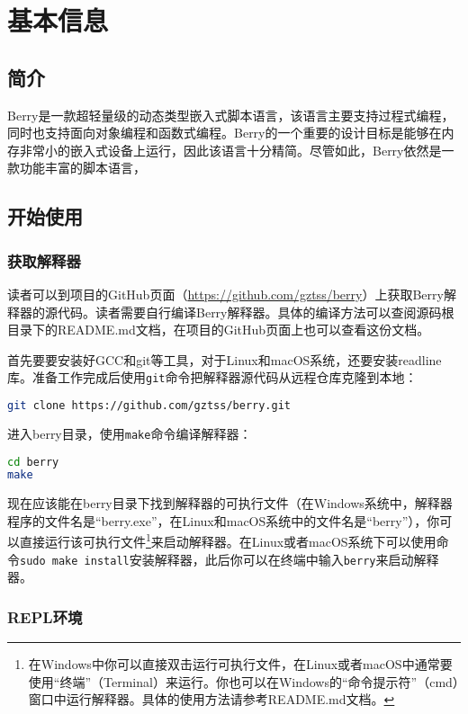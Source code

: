\chapter{基本信息}

\section{简介}

Berry是一款超轻量级的动态类型嵌入式脚本语言，该语言主要支持过程式编程，同时也支持面向对象编程和函数式编程。Berry的一个重要的设计目标是能够在内存非常小的嵌入式设备上运行，因此该语言十分精简。尽管如此，Berry依然是一款功能丰富的脚本语言，

\section{开始使用}

\subsection{获取解释器}

读者可以到项目的GitHub页面（\url{https://github.com/gztss/berry}）上获取Berry解释器的源代码。读者需要自行编译Berry解释器。具体的编译方法可以查阅源码根目录下的README.md文档，在项目的GitHub页面上也可以查看这份文档。

首先要要安装好GCC和git等工具，对于Linux和macOS系统，还要安装readline库。准备工作完成后使用\texttt{git}命令把解释器源代码从远程仓库克隆到本地：
\begin{lstlisting}[language=bash, numbers=none]
git clone https://github.com/gztss/berry.git
\end{lstlisting}
进入berry目录，使用\texttt{make}命令编译解释器：
\begin{lstlisting}[language=bash, numbers=none]
cd berry
make
\end{lstlisting}

现在应该能在berry目录下找到解释器的可执行文件（在Windows系统中，解释器程序的文件名是``berry.exe''，在Linux和macOS系统中的文件名是``berry''），你可以直接运行该可执行文件\footnote{在Windows中你可以直接双击运行可执行文件，在Linux或者macOS中通常要使用``终端''（Terminal）来运行。你也可以在Windows的``命令提示符''（cmd）窗口中运行解释器。具体的使用方法请参考README.md文档。}来启动解释器。在Linux或者macOS系统下可以使用命令\texttt{sudo make install}安装解释器，此后你可以在终端中输入\texttt{berry}来启动解释器。

\subsection{REPL环境}

